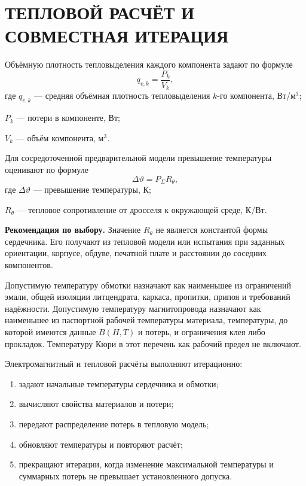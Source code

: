 \documentclass[14pt,a4paper]{extarticle}
\newcommand{\recommend}{\par\noindent\textbf{Рекомендация по выбору.} }
\begin{document}
\section{ТЕПЛОВОЙ РАСЧЁТ И СОВМЕСТНАЯ ИТЕРАЦИЯ}
\label{sec:thermal}

Объёмную плотность тепловыделения каждого компонента задают по формуле
\begin{equation}
 q_{v,k}=\frac{P_k}{V_k},
 \label{eq:heat-density}
\end{equation}
где $q_{v,k}$ --- средняя объёмная плотность тепловыделения $k$-го
компонента, Вт/м$^3$;\par\noindent
$P_k$ --- потери в компоненте, Вт;\par\noindent
$V_k$ --- объём компонента, м$^3$.

Для сосредоточенной предварительной модели превышение температуры
оценивают по формуле
\begin{equation}
 \Delta\vartheta=P_{\Sigma}R_{\theta},
 \label{eq:thermal-resistance}
\end{equation}
где $\Delta\vartheta$ --- превышение температуры, К;\par\noindent
$R_{\theta}$ --- тепловое сопротивление от дросселя к окружающей среде,
К/Вт.

\recommend Значение $R_{\theta}$ не является константой формы
сердечника. Его получают из тепловой модели или испытания при заданных
ориентации, корпусе, обдуве, печатной плате и расстоянии до соседних
компонентов.

Допустимую температуру обмотки назначают как наименьшее из ограничений
эмали, общей изоляции литцендрата, каркаса, пропитки, припоя и требований
надёжности. Допустимую температуру магнитопровода назначают как наименьшее из
паспортной рабочей температуры материала, температуры, до которой имеются
данные $B(H,T)$ и потерь, и ограничения клея либо прокладок. Температуру Кюри
в этот перечень как рабочий предел не включают.

Электромагнитный и тепловой расчёты выполняют итерационно:
\begin{enumerate}
 \item задают начальные температуры сердечника и обмотки;
 \item вычисляют свойства материалов и потери;
 \item передают распределение потерь в тепловую модель;
 \item обновляют температуры и повторяют расчёт;
 \item прекращают итерации, когда изменение максимальной температуры и
 суммарных потерь не превышает установленного допуска.
\end{enumerate}
\end{document}
